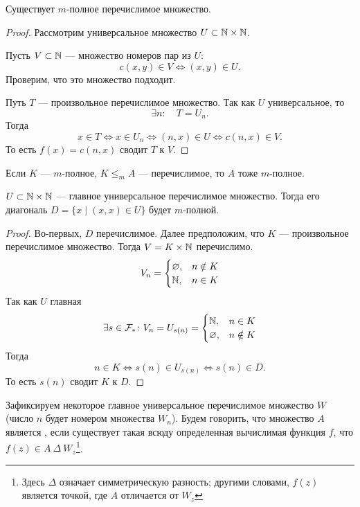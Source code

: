 \begin{thm}
    Существует $ m$-полное перечислимое множество.
\end{thm}
\begin{proof}
   Рассмотрим универсальное множество $ U \subset \mathbb{N} \times \mathbb{N}$.

	Пусть $ V \subset \mathbb{N}$ --- множество номеров пар из  $ U$:
	 \[
		 c(x, y) \in V  \Longleftrightarrow (x, y) \in U
	.\] 
	Проверим, что это множество подходит.

	Путь $ T$ --- произвольное перечислимое множество. Так как $ U$ универсальное, то
	\[
	\exists n \colon \quad T = U_n
	.\] 
	Тогда
	\[
		x \in T \Longleftrightarrow x \in U_n \Longleftrightarrow (n, x) \in U \Longleftrightarrow  c(n, x) \in V
	.\] 
	То есть $ f(x) = c(n, x)$ сводит $ T $ к $ V$.
\end{proof}


\begin{note}
    Если $ K$ --- $ m$-полное,  $ K \le _{m} A$ --- перечислимое, то $ A$ тоже $ m$-полное. 
\end{note}


\begin{thm}
	$ U \subset \mathbb{N} \times \mathbb{N}$ --- главное универсальное перечислимое множество. Тогда его диагональ $ D = \{x \mid (x, x) \in  U\}$ будет $ m$-полной.
\end{thm}
\begin{proof}
    Во-первых, $ D$ перечислимое. Далее предположим, что $ K$ --- произвольное перечислимое множество. Тогда $ V = K \times \mathbb{N}$  перечислимо.
	\[
	V_n = \begin{cases}
		\varnothing, & n \notin K \\
		\mathbb{N} , & n \in K
	\end{cases}
	\] 
	Так как $ U$ главная 
	$$ \exists s \in \mathcal{F}_{*}\colon V_n=U_{s(n)} = \begin{cases}
		\mathbb{N}, &n \in K \\
		\varnothing, & n \notin K
	\end{cases}
	$$
	Тогда 
	\[
		n \in K \Longleftrightarrow s(n) \in U_{s(n)} \Longleftrightarrow s(n) \in D
	.\] 
	То есть $ s(n)$ сводит  $ K $ к $ D$.
\end{proof}

\begin{defn}
    Зафиксируем некоторое главное универсальное перечислимое множество $ W$ (число $ n$ будет номером множества $W_n$).
	Будем говорить, что множество $ A$ является , если существует такая всюду определенная вычислимая функция $ f$, что $ f(z) \in A ~\Delta ~W_z$\footnote{Здесь $ \Delta$ означает симметрическую разность; другими словами, $ f(z)$ является точкой, где $ A$ отличается от $ W_z$}.
\end{defn}

